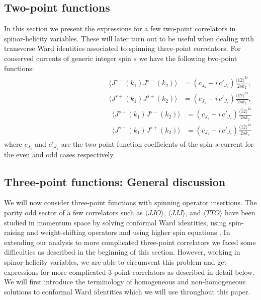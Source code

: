 \documentclass[a4paper,11pt]{article}
\begin{document}
\subsection{Two-point functions}
In this section we present the expressions for a few two-point correlators in spinor-helicity variables. These will later turn out to be useful when dealing with transverse Ward identities associated to spinning three-point correlators. 
For conserved currents of generic integer spin $s$ we have the following two-point functions:
\begin{align}\label{JsJstwopointfn}
\begin{split}
\langle J^{s-}(k_1) J^{s-}(k_2) \rangle &=\left(c_{J_s}+i\,c'_{J_s}\right)\frac{\langle 12 \rangle^{2s}}{2s k_2},\\[5 pt]
\langle J^{s+}(k_1) J^{s+}(k_2) \rangle &=\left(c_{J_s}-i\,c'_{J_s}\right)\frac{\langle {\bar 1}{\bar 2} \rangle^{2s}}{2s k_2},
\end{split}
\begin{split}
\langle J^{s+}(k_1) J^{s-}(k_2) \rangle &=\left(c_{J_s}+i\,c'_{J_s}\right)\frac{\langle \bar{1}2 \rangle^{2s}}{2s k_2}\\[5 pt]
\langle J^{s-}(k_1) J^{s+}(k_2) \rangle &=\left(c_{J_s}-i\,c'_{J_s}\right)\frac{\langle  1{\bar 2} \rangle^{2s}}{2s k_2}
\end{split}
\end{align}
where $c_{J_s}$ and $c'_{J_s}$ are the two-point function coefficients of the spin-$s$ current for the even and odd cases respectively.


\subsection{Three-point functions: General discussion}
We will now consider three-point functions with spinning operator insertions. The parity odd sector of a few correlators such as $\langle JJO\rangle$, $\langle JJJ\rangle$, and $\langle TTO\rangle$ have been studied in momentum space by solving conformal Ward identities, using spin-raising and weight-shifting operators and using higher spin equations \cite{Jain:2020rmw,Jain:2020puw,Jain:2021wyn}. In extending our analysis to more complicated three-point correlators we faced some difficulties as described in the beginning of this section. However, working in spinor-helicity variables, we are able to circumvent this problem and get expressions for more complicated 3-point correlators as described in detail below. We will first introduce the terminology of homogeneous and non-homogeneous solutions to conformal Ward identities which we will use throughout this paper.
\end{document}
